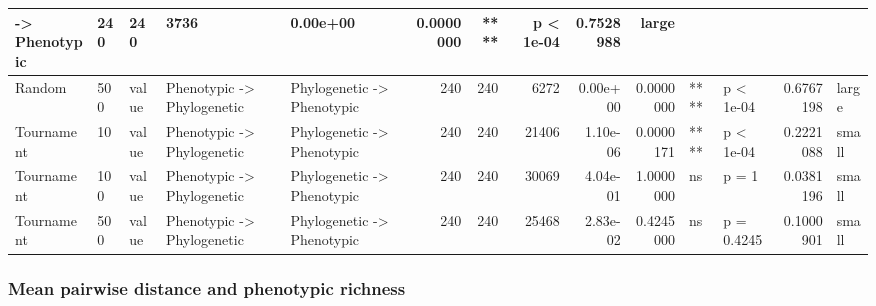 \documentclass[]{book}
\begin{document}
\begin{table}
\begin{tabular}[t]{l|l|l|l|l|r|r|r|r|r|l|l|r|l}
    ->
Phenotypic & 240 & 240 & 3736 & 0.00e+00 & 0.0000000 & **** & p < 1e-04 & 0.7528988 & large\\
\hline
Random & 500 & value & Phenotypic
    ->
Phylogenetic & Phylogenetic
    ->
Phenotypic & 240 & 240 & 6272 & 0.00e+00 & 0.0000000 & **** & p < 1e-04 & 0.6767198 & large\\
\hline
Tournament & 10 & value & Phenotypic
    ->
Phylogenetic & Phylogenetic
    ->
Phenotypic & 240 & 240 & 21406 & 1.10e-06 & 0.0000171 & **** & p < 1e-04 & 0.2221088 & small\\
\hline
Tournament & 100 & value & Phenotypic
    ->
Phylogenetic & Phylogenetic
    ->
Phenotypic & 240 & 240 & 30069 & 4.04e-01 & 1.0000000 & ns & p = 1 & 0.0381196 & small\\
\hline
Tournament & 500 & value & Phenotypic
    ->
Phylogenetic & Phylogenetic
    ->
Phenotypic & 240 & 240 & 25468 & 2.83e-02 & 0.4245000 & ns & p = 0.4245 & 0.1000901 & small\\
\hline
\end{tabular}
\end{table}

\hypertarget{mean-pairwise-distance-and-phenotypic-richness-1}{%
\subsubsection{Mean pairwise distance and phenotypic richness}\label{mean-pairwise-distance-and-phenotypic-richness-1}}
\end{document}
